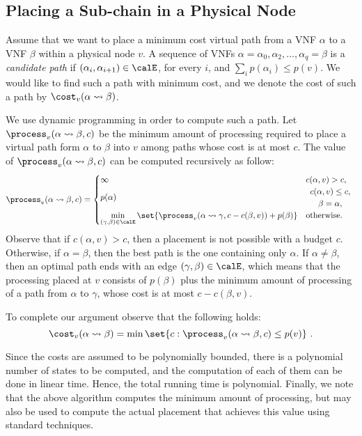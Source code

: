 
\subsection{Placing a Sub-chain in a Physical Node}

Assume that we want to place a minimum cost virtual path from a VNF
$\alpha$ to a VNF $\beta$ within a physical node $v$.  A sequence of
VNFs $\alpha = \alpha_0,\alpha_2,\ldots,\alpha_q = \beta$ is a
\emph{candidate path} if $(\alpha_i,\alpha_{i+1}) \in \calE$, for
every $i$, and $\sum_i p(\alpha_i) \leq p(v)$.  We would like to find
such a path with minimum cost, and we denote the cost of such a path
by $\cost_v(\alpha \leadsto \beta)$.

We use dynamic programming in order to compute such a path.  Let
$\process_v(\alpha \leadsto \beta,c)$ be the minimum amount of
processing required to place a virtual path form $\alpha$ to $\beta$
into $v$ among paths whose cost is at most $c$.
%
The value of $\process_v(\alpha \leadsto \beta,c)$ can be computed
recursively as follow:
\[
\process_v(\alpha \leadsto \beta, c) =
\begin{cases}
\infty    & c(\alpha,v) > c, \\
p(\alpha) &
\begin{array}{c}
c(\alpha,v) \leq c, \\
\beta = \alpha,
\end{array}
\\
\displaystyle
\min_{(\gamma,\beta) \in \calE}
   \set{\process_v(\alpha \leadsto \gamma, c - c(\beta,v)) + p(\beta)}
          & \text{otherwise}.
\end{cases}
\]
Observe that if $c(\alpha,v) > c$, then a placement is not possible
with a budget $c$.  Otherwise, if $\alpha = \beta$, then the best path
is the one containing only $\alpha$.  If $\alpha \neq \beta$, then an
optimal path ends with an edge $(\gamma,\beta) \in \calE$, which means
that the processing placed at $v$ consists of $p(\beta)$ plus the
minimum amount of processing of a path from $\alpha$ to $\gamma$,
whose cost is at most $c - c(\beta,v)$.

To complete our argument observe that the following holds:
\[
\cost_v(\alpha \leadsto \beta)
= \min \set{c : \process_v(\alpha \leadsto \beta, c) \leq p(v)}
~.
\]

Since the costs are assumed to be polynomially bounded, there is a
polynomial number of states to be computed, and the computation of
each of them can be done in linear time.  Hence, the total running
time is polynomial.  Finally, we note that the above algorithm
computes the minimum amount of processing, but may also be used to
compute the actual placement that achieves this value using standard
techniques.

